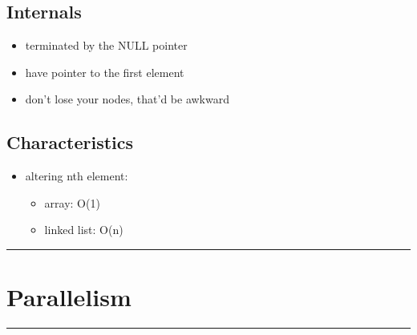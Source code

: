\documentclass[10pt, multicolumn, a4paper]{article}
\begin{document}
\begin{multicols}{2}
	\subsection*{Internals}
	\begin{itemize}
	\item terminated by the NULL pointer
	\item have pointer to the first element
	\item don't lose your nodes, that'd be awkward
	\end{itemize}
	\subsection*{Characteristics}
	\begin{itemize}
	\item altering nth element:
		\begin{itemize}
		\item array: O(1)
		\item linked list: O(n)
		\end{itemize}
	\end{itemize}
\end{multicols}


\hrule
\section{Parallelism}
\hrule 
\end{document}
